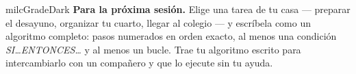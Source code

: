 \documentclass[11pt,letterpaper]{article}
\begin{document}
\begin{infoband}{milcGradeDark}
\textbf{Para la próxima sesión.} Elige una tarea de tu casa --- preparar el desayuno, organizar tu cuarto, llegar al colegio --- y escríbela como un algoritmo completo: pasos numerados en orden exacto, al menos una condición \emph{SI\ldots ENTONCES\ldots} y al menos un bucle. Trae tu algoritmo escrito para intercambiarlo con un compañero y que lo ejecute sin tu ayuda.
\end{infoband}
\end{document}
